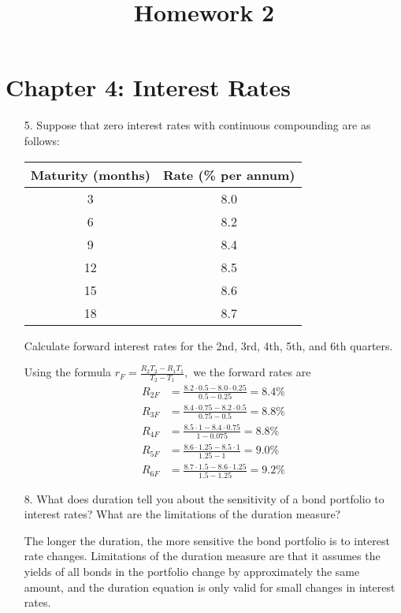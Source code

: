 \documentclass{article}
\begin{document}
\title{Homework 2}
\maketitle
\thispagestyle{fancy}

\section*{Chapter 4: Interest Rates}

\begin{itemize}
	\item[5.] Suppose that zero interest rates with continuous compounding are as follows:
		\begin{center}
			\begin{tabular}{cc}
				Maturity (months) & Rate (\% per annum) \\
				\hline
				3 & 8.0 \\
				6 & 8.2 \\
				9 & 8.4 \\
				12 & 8.5 \\
				15 & 8.6 \\
				18 & 8.7
			\end{tabular}
		\end{center}
		Calculate forward interest rates for the 2nd, 3rd, 4th, 5th, and 6th quarters.
		\begin{soln}
			Using the formula $r_F=\frac{R_2T_2-R_1T_1}{T_2-T_1},$ we the forward rates are
			\begin{align*}
				R_{2F} &= \frac{8.2\cdot 0.5-8.0\cdot0.25}{0.5-0.25} = 8.4\% \\
				R_{3F} &= \frac{8.4\cdot 0.75-8.2\cdot 0.5}{0.75-0.5} = 8.8\% \\
				R_{4F} &= \frac{8.5\cdot 1 - 8.4\cdot 0.75}{1-0.075} = 8.8\% \\
				R_{5F} &= \frac{8.6\cdot 1.25 - 8.5\cdot 1}{1.25-1} = 9.0\% \\
				R_{6F} &= \frac{8.7\cdot 1.5-8.6\cdot 1.25}{1.5-1.25} = 9.2\%
			\end{align*}
		\end{soln}

	\item[8.] What does duration tell you about the sensitivity of a bond portfolio to interest rates? What are the limitations of the duration measure?
		\begin{answer*}
			The longer the duration, the more sensitive the bond portfolio is to interest rate changes. Limitations of the duration measure are that it assumes the yields of all bonds in the portfolio change by approximately the same amount, and the duration equation is only valid for small changes in interest rates.
		\end{answer*}


\end{itemize}
\end{document}
